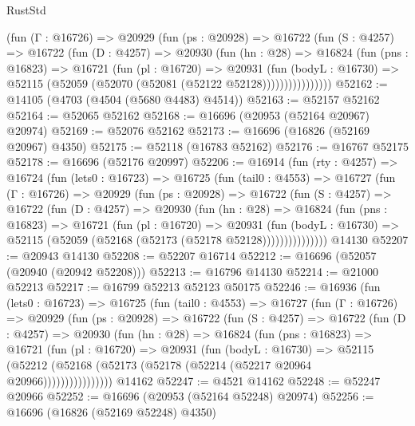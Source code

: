 \begin{lexlean}{RustStd}
\begin{coremodule}
            (fun (Γ : @16726) =>
            @20929
              (fun (ps : @20928) =>
              @16722
                (fun (S : @4257) =>
                @16722
                  (fun (D : @4257) =>
                  @20930
                    (fun (hn : @28) =>
                    @16824
                      (fun (pns : @16823) =>
                      @16721
                        (fun (pl : @16720) =>
                        @20931
                          (fun (bodyL : @16730) =>
                          @52115 (@52059 (@52070 (@52081 (@52122 @52128))))))))))))))))
@52162 := @14105 (@4703 (@4504 (@5680 @4483) @4514))
@52163 := @52157 @52162
@52164 := @52065 @52162
@52168 := @16696 (@20953 (@52164 @20967) @20974)
@52169 := @52076 @52162
@52173 := @16696 (@16826 (@52169 @20967) @4350)
@52175 := @52118 (@16783 @52162)
@52176 := @16767 @52175
@52178 := @16696 (@52176 @20997)
@52206 := @16914
    (fun (rty : @4257) =>
    @16724
      (fun (lets0 : @16723) =>
      @16725
        (fun (tail0 : @4553) =>
        @16727
          (fun (Γ : @16726) =>
          @20929
            (fun (ps : @20928) =>
            @16722
              (fun (S : @4257) =>
              @16722
                (fun (D : @4257) =>
                @20930
                  (fun (hn : @28) =>
                  @16824
                    (fun (pns : @16823) =>
                    @16721
                      (fun (pl : @16720) =>
                      @20931
                        (fun (bodyL : @16730) =>
                        @52115 (@52059 (@52168 (@52173 (@52178 @52128)))))))))))))))
    @14130
@52207 := @20943 @14130
@52208 := @52207 @16714
@52212 := @16696 (@52057 (@20940 (@20942 @52208)))
@52213 := @16796 @14130
@52214 := @21000 @52213
@52217 := @16799 @52213 @52123 @50175
@52246 := @16936
    (fun (lets0 : @16723) =>
    @16725
      (fun (tail0 : @4553) =>
      @16727
        (fun (Γ : @16726) =>
        @20929
          (fun (ps : @20928) =>
          @16722
            (fun (S : @4257) =>
            @16722
              (fun (D : @4257) =>
              @20930
                (fun (hn : @28) =>
                @16824
                  (fun (pns : @16823) =>
                  @16721
                    (fun (pl : @16720) =>
                    @20931
                      (fun (bodyL : @16730) =>
                      @52115
                        (@52212
                          (@52168 (@52173 (@52178 (@52214 (@52217 @20964 @20966))))))))))))))))
    @14162
@52247 := @4521 @14162
@52248 := @52247 @20966
@52252 := @16696 (@20953 (@52164 @52248) @20974)
@52256 := @16696 (@16826 (@52169 @52248) @4350)

\end{coremodule}
\end{lexlean}
